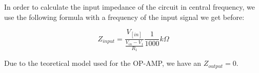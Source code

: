 In order to calculate the input impedance of the circuit in central frequency,
we use the following formula with a frequency of the input signal we get before:

\begin{equation}
  Z_{input} = \frac{V_[in]}{\frac{V_{in} - V_1}{R_1}} \frac{1}{1000} k \Omega
\end{equation}

Due to the teoretical model used for the OP-AMP, we have an $Z_{output} = 0$.


\begin{table}[h]
  {
    \centering
    \begin{tabular}{|c|c|c|}
      \hline
      
    \end{tabular}
    \label{tab:TheoreticalResults}
    \caption{ }
  }
\end{table}

